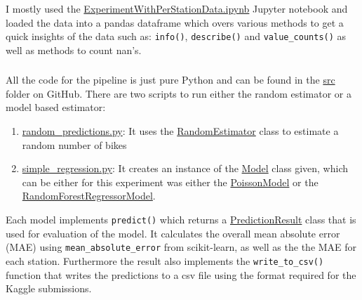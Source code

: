 \documentclass[a4paper]{article}
\begin{document}
    \subsubsection*{}
    I mostly used the
    \href{https://github.com/isabelladegen/mlp-2021/blob/main/notebooks/ExperimentWithPerStationData.ipynb}{ExperimentWithPerStationData.ipynb}
    Jupyter notebook and loaded the data into a pandas dataframe \cite{reback2020pandas} which overs various methods
    to get a quick insights of the data such as: \texttt{info()}, \texttt{describe()} and \texttt{value\_counts()} as well
    as methods to count nan's.

    \subsubsection*{}
    All the code for the pipeline is just pure Python and can be found in the
    \href{https://github.com/isabelladegen/mlp-2021/tree/main/src}{src} folder on GitHub. There are two
    scripts to run either the random estimator or a model based estimator:
    \begin{enumerate}
        \item \href{https://github.com/isabelladegen/mlp-2021/blob/main/src/random_predictions.py}{random\_predictions.py}:
        It uses the \href{https://github.com/isabelladegen/mlp-2021/blob/c48d85dc364b5a2e7e59f16961b32f9e6c245735/src/models/RandomEstimator.py}{RandomEstimator}
        class to estimate a random number of bikes
        \item \href{https://github.com/isabelladegen/mlp-2021/blob/main/src/simple_regression.py}{simple\_regression.py}: It creates
        an instance of the \href{https://github.com/isabelladegen/mlp-2021/blob/main/src/models/Model.py}{Model} class given, which
        can be either for this experiment was either the \href{https://github.com/isabelladegen/mlp-2021/blob/main/src/models/PoissonModel.py}{PoissonModel}
        or the \href{https://github.com/isabelladegen/mlp-2021/blob/main/src/models/RandomForestRegressorModel.py}{RandomForestRegressorModel}.
    \end{enumerate}

    Each model implements \texttt{predict()} which returns a  \href{https://github.com/isabelladegen/mlp-2021/blob/c48d85dc364b5a2e7e59f16961b32f9e6c245735/src/PredictionResult.py}{PredictionResult}
    class that is used for evaluation of the model. It calculates the overall mean absolute error (MAE) using \texttt{mean\_absolute\_error}
    from scikit-learn, as well as the the MAE for each station. Furthermore the result also implements the
    \texttt{write\_to\_csv()} function that writes the predictions to a csv file using the format required for the Kaggle submissions.
\end{document}
